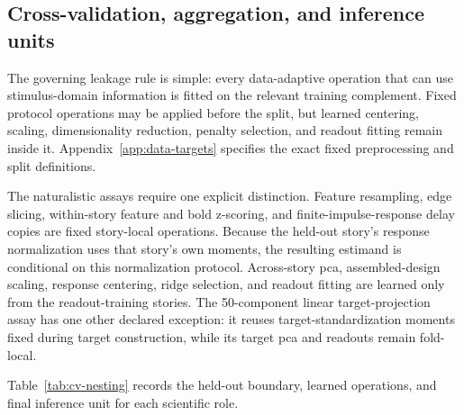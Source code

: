 \subsection{Cross-validation, aggregation, and inference units}

The governing leakage rule is simple: every data-adaptive operation that can use stimulus-domain information is fitted on the relevant training complement.
Fixed protocol operations may be applied before the split, but learned centering, scaling, dimensionality reduction, penalty selection, and readout fitting remain inside it.
Appendix~\ref{app:data-targets} specifies the exact fixed preprocessing and split definitions.

The naturalistic assays require one explicit distinction.
Feature resampling, edge slicing, within-story feature and \ac{bold} z-scoring, and finite-impulse-response delay copies are fixed story-local operations.
Because the held-out story's response normalization uses that story's own moments, the resulting estimand is conditional on this normalization protocol.
Across-story \ac{pca}, assembled-design scaling, response centering, ridge selection, and readout fitting are learned only from the readout-training stories.
The 50-component linear target-projection assay has one other declared exception: it reuses target-standardization moments fixed during target construction, while its target \ac{pca} and readouts remain fold-local. 

Table~\ref{tab:cv-nesting} records the held-out boundary, learned operations, and final inference unit for each scientific role.

